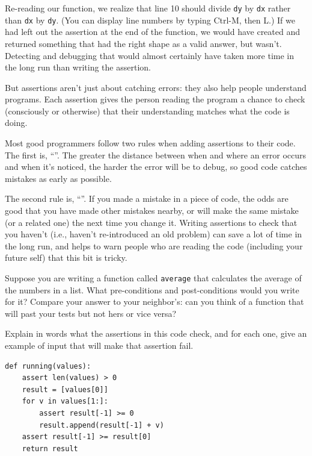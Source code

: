 \documentclass{book}
\begin{document}
Re-reading our function, we realize that line 10 should divide
\texttt{dy} by \texttt{dx} rather than \texttt{dx} by \texttt{dy}. (You
can display line numbers by typing Ctrl-M, then L.) If we had left out
the assertion at the end of the function, we would have created and
returned something that had the right shape as a valid answer, but
wasn't. Detecting and debugging that would almost certainly have taken
more time in the long run than writing the assertion.

But assertions aren't just about catching errors: they also help people
understand programs. Each assertion gives the person reading the program
a chance to check (consciously or otherwise) that their understanding
matches what the code is doing.

Most good programmers follow two rules when adding assertions to their
code. The first is, ``''. The greater the distance between when and where an
error occurs and when it's noticed, the harder the error will be to
debug, so good code catches mistakes as early as possible.

The second rule is,
``''. If you made a mistake in a piece of code,
the odds are good that you have made other mistakes nearby, or will make
the same mistake (or a related one) the next time you change it. Writing
assertions to check that you haven't 
(i.e., haven't re-introduced an old problem) can save a lot of time in
the long run, and helps to warn people who are reading the code
(including your future self) that this bit is tricky.

\begin{challenge}
  Suppose you are writing a function called \texttt{average} that
  calculates the average of the numbers in a list. What pre-conditions
  and post-conditions would you write for it? Compare your answer to
  your neighbor's: can you think of a function that will past your tests
  but not hers or vice versa?
\end{challenge}

\begin{challenge}
  Explain in words what the assertions in this code check, and for each
  one, give an example of input that will make that assertion fail.

\begin{verbatim}
def running(values):
    assert len(values) > 0
    result = [values[0]]
    for v in values[1:]:
        assert result[-1] >= 0
        result.append(result[-1] + v)
    assert result[-1] >= result[0]
    return result
\end{verbatim}
\end{challenge}
\end{document}
